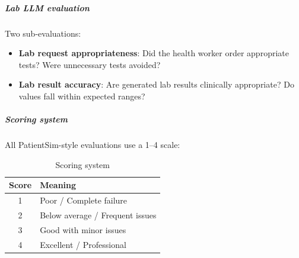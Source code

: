 \subparagraph{Lab LLM evaluation}
Two sub-evaluations:
\begin{itemize}
    \item \textbf{Lab request appropriateness}: Did the health worker order appropriate tests? Were unnecessary tests avoided?
    \item \textbf{Lab result accuracy}: Are generated lab results clinically appropriate? Do values fall within expected ranges?
\end{itemize}

\subparagraph{Scoring system}
All PatientSim-style evaluations use a 1--4 scale:
\begin{table}[h]
\centering
\begin{tabular}{|c|l|}
\hline
\textbf{Score} & \textbf{Meaning} \\
\hline
1 & Poor / Complete failure \\
2 & Below average / Frequent issues \\
3 & Good with minor issues \\
4 & Excellent / Professional \\
\hline
\end{tabular}
\caption{Scoring system}
\end{table}
